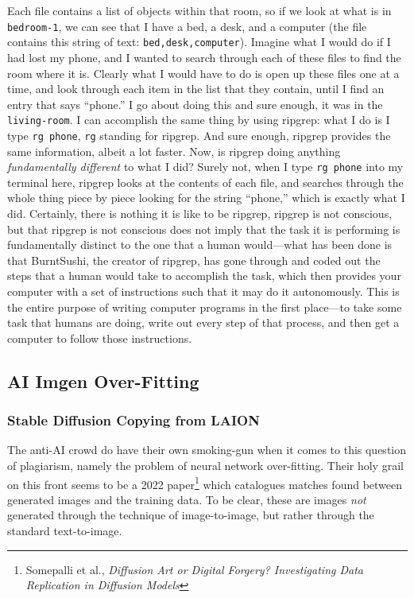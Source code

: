 \documentclass[11pt]{article}
\begin{document}
Each file contains a list of objects within that room, so if we look at what is in \texttt{bedroom-1}, we can see that I have a bed, a desk, and a computer (the file contains this string of text: \texttt{bed,desk,computer}). Imagine what I would do if I had lost my phone, and I wanted to search through each of these files to find the room where it is. Clearly what I would have to do is open up these files one at a time, and look through each item in the list that they contain, until I find an entry that says ``phone.'' I go about doing this and sure enough, it was in the \texttt{living-room}. I can accomplish the same thing by using ripgrep: what I do is I type \texttt{rg phone}, \texttt{rg} standing for ripgrep. And sure enough, ripgrep provides the same information, albeit a lot faster. Now, is ripgrep doing anything \emph{fundamentally different} to what I did? Surely not, when I type \texttt{rg phone} into my terminal here, ripgrep looks at the contents of each file, and searches through the whole thing piece by piece looking for the string ``phone,'' which is exactly what I did. Certainly, there is nothing it is like to be ripgrep, ripgrep is not conscious, but that ripgrep is not conscious does not imply that the task it is performing is fundamentally distinct to the one that a human would---what has been done is that BurntSushi, the creator of ripgrep, has gone through and coded out the steps that a human would take to accomplish the task, which then provides your computer with a set of instructions such that it may do it autonomously. This is the entire purpose of writing computer programs in the first place---to take some task that humans are doing, write out every step of that process, and then get a computer to follow those instructions.

\subsection*{AI Imgen Over-Fitting}
\label{sec:org9d9d90d}
\subsubsection*{Stable Diffusion Copying from LAION}
\label{sec:org081553f}
The anti-AI crowd do have their own smoking-gun when it comes to this question of plagiarism, namely the problem of neural network over-fitting. Their holy grail on this front seems to be a 2022 paper\footnote{Somepalli et al., \emph{Diffusion Art or Digital Forgery? Investigating Data Replication in Diffusion Models}} which catalogues matches found between generated images and the training data. To be clear, these are images \emph{not} generated through the technique of image-to-image, but rather through the standard text-to-image.
\end{document}
